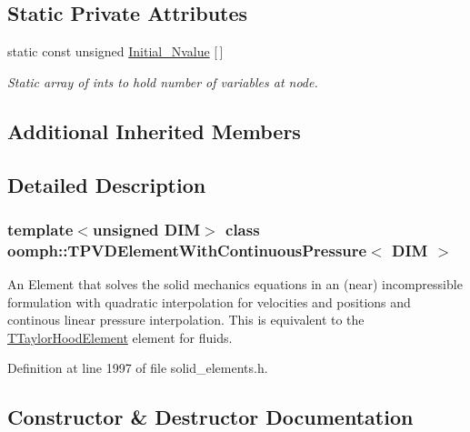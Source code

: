 \subsection*{Static Private Attributes}
\begin{DoxyCompactItemize}
\item 
static const unsigned \hyperlink{classoomph_1_1TPVDElementWithContinuousPressure_a5bed60102fb48fc222cf9c9ac0348c27}{Initial\+\_\+\+Nvalue} \mbox{[}$\,$\mbox{]}
\begin{DoxyCompactList}\small\item\em Static array of ints to hold number of variables at node. \end{DoxyCompactList}\end{DoxyCompactItemize}
\subsection*{Additional Inherited Members}


\subsection{Detailed Description}
\subsubsection*{template$<$unsigned D\+IM$>$\newline
class oomph\+::\+T\+P\+V\+D\+Element\+With\+Continuous\+Pressure$<$ D\+I\+M $>$}

An Element that solves the solid mechanics equations in an (near) incompressible formulation with quadratic interpolation for velocities and positions and continous linear pressure interpolation. This is equivalent to the \hyperlink{classoomph_1_1TTaylorHoodElement}{T\+Taylor\+Hood\+Element} element for fluids. 

Definition at line 1997 of file solid\+\_\+elements.\+h.



\subsection{Constructor \& Destructor Documentation}
\mbox{\label{classoomph_1_1TPVDElementWithContinuousPressure_a33256a965bca2ec231d8f92aa37b7e25}} 
